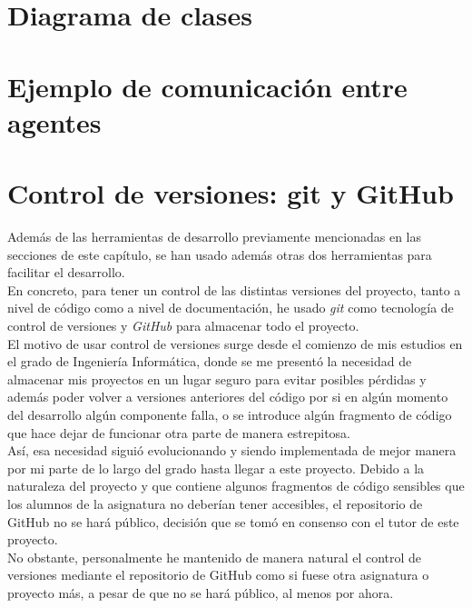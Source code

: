 \section{Diagrama de clases}

\section{Ejemplo de comunicación entre agentes}

\section{Control de versiones: git y GitHub}

Además de las herramientas de desarrollo previamente mencionadas en las secciones de este capítulo, se han usado además otras dos herramientas para facilitar el desarrollo.\\

En concreto, para tener un control de las distintas versiones del proyecto, tanto a nivel de código como a nivel de documentación, he usado \textit{git} como tecnología de control de versiones y \textit{GitHub} para almacenar todo el proyecto.\\

El motivo de usar control de versiones surge desde el comienzo de mis estudios en el grado de Ingeniería Informática, donde se me presentó la necesidad de almacenar mis proyectos en un lugar seguro para evitar posibles pérdidas y además poder volver a versiones anteriores del código por si en algún momento del desarrollo algún componente falla, o se introduce algún fragmento de código que hace dejar de funcionar otra parte de manera estrepitosa.\\

Así, esa necesidad siguió evolucionando y siendo implementada de mejor manera por mi parte de lo largo del grado hasta llegar a este proyecto. Debido a la naturaleza del proyecto y que contiene algunos fragmentos de código sensibles que los alumnos de la asignatura no deberían tener accesibles, el repositorio de GitHub no se hará público, decisión que se tomó en consenso con el tutor de este proyecto.\\

No obstante, personalmente he mantenido de manera natural el control de versiones mediante el repositorio de GitHub como si fuese otra asignatura o proyecto más, a pesar de que no se hará público, al menos por ahora.